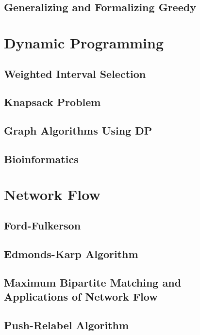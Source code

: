 \documentclass[11pt,fleqn,dvipsnames]{book} %
\begin{document}
\chapter{Generalizing and Formalizing Greedy}


\part{Dynamic Programming}

\chapter{Weighted Interval Selection}


\chapter{Knapsack Problem}


\chapter{Graph Algorithms Using DP}


\chapter{Bioinformatics}


\part{Network Flow}
\chapter{Ford-Fulkerson}


\chapter{Edmonds-Karp Algorithm}


\chapter{Maximum Bipartite Matching and Applications of Network Flow}


\chapter{Push-Relabel Algorithm}

\end{document}
